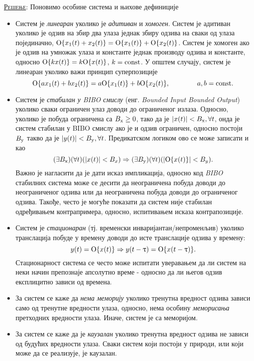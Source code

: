 \textsc{\underline{Решење}}:
Поновимо особине система и њихове дефиниције
\begin{itemize}
    \item Систем је \textit{линеаран} уколико је \textit{адитиван} и \textit{хомоген}. Систем је адитиван уколико је 
    одзив на збир два улаза једнак збиру одзива на сваки од улаза појединачно, 
    ${{\rm O}\{x_1(t) + x_2(t)\} = {\rm O}\{x_1(t)\} + {\rm O}\{x_2(t)\}}$.
    Систем је хомоген ако је
    одзив на умножак улаза и константе једнак производу одзива и константе, односно
    ${\rm O}\{kx(t)\} = k {\rm O}\{x(t)\}$, $k = \rm const$. У општем случају, систем је линеаран уколико важи принцип 
    суперпозиције 
    \begin{equation}
        {{\rm O}\{ax_1(t) + bx_2(t)\} = a{\rm O}\{x_1(t)\} + b{\rm O}\{x_2(t)\}}, \qquad \qquad a,b = \rm const.
    \end{equation}
    \item Систем је \textit{стабилан у \textit{BIBO} смислу} (енг. \textit{Bounded Input Bounded Output}) 
    уколико сваки ограничен улаз доводи до ограниченог излаза. Односно, уколико је побуда ограничена са $B_{\rm x} \geq 0$,
    тако да је $|x(t)| < B_{\rm x}, \forall t$, онда је систем стабилан у BIBO смислу ако је и одзив ограничен, 
    односно постоји $B_{\rm y}$ такво да је $|y(t)| < B_{\rm y}, \forall t$. Предикатском логиком ово се може записати 
    и као 
    \begin{equation}
        (\exists B_{\rm x})(\forall t)( |x(t)| < B_x ) \Rightarrow
        (\exists B_{\rm y})(\forall t)( |{\rm O}\{x(t)\}| < B_y ).
    \end{equation}
    Важно је нагласити да је дати исказ импликација,
    односно код \textit{BIBO} стабилних система може се десити да неограничена побуда доводи до неограниченог одзива 
    или да неограничена побуда доводи до ограниченог одзива. Такође, често је могуће показати да систем није 
    стабилан одређивањем контрапримера, односно, испитивањем исказа контрапозиције.

    \item Систем је \textit{стационаран} (тј. временски инваријантан/непроменљив) уколико транслација побуде у времену 
    доводи до исте транслације одзива у времену: 
    \begin{equation}
        {y(t) = {\rm O}\{x(t)\} \Rightarrow y(t - \uptau) = {\rm O}\{x(t - \uptau)\}}.
    \end{equation}
    Стационарност система се често може испитати уверавањем да ли систем на неки начин препознаје апсолутно време - односно 
    да ли његов одзив експлицитно зависи од времена.
    \item За систем се каже да \textit{нема меморију} уколико тренутна вредност одзива зависи само од тренутне вредности улаза, односно, нема 
    особину \textit{меморисања} претходних вредности улаза. Иначе, систем је са меморијом. 

    \item За систем се каже да је  \textit{каузалан} уколико тренутна вредност одзива не зависи од будућих вредности улаза. 
    Сваки систем који постоји у природи, или који може да се реализује, је каузалан.
\end{itemize}

